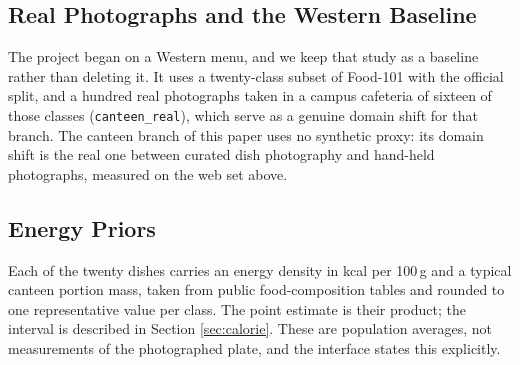 \subsection{Real Photographs and the Western Baseline}
The project began on a Western menu, and we keep that study as a baseline rather
than deleting it. It uses a twenty-class subset of Food-101
\cite{bossard2014food101} with the official split, and a hundred real
photographs taken in a campus cafeteria of sixteen of those classes
(\texttt{canteen\_real}), which serve as a genuine domain shift for that branch.
The canteen branch of this paper uses no synthetic proxy: its domain shift is the
real one between curated dish photography and hand-held photographs, measured on
the web set above.

\subsection{Energy Priors}
Each of the twenty dishes carries an energy density in kcal per 100\,g and a
typical canteen portion mass, taken from public food-composition tables and
rounded to one representative value per class. The point estimate is their
product; the interval is described in Section \ref{sec:calorie}. These are
population averages, not measurements of the photographed plate, and the
interface states this explicitly.